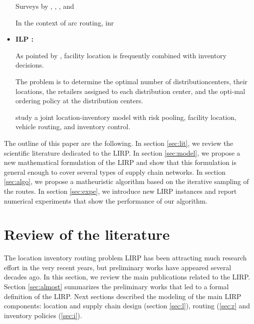 \documentclass[a4paper,10pt]{article}
\begin{document}
\begin{linenumbers}
\begin{itemize}
		
	
	\cite{Laporte1987} 
	
	Surveys by \cite{MinJS98}, \cite{NagySahli07}, \cite{ProdhonPrins2014}, \cite{DrexlSchneider2015} and \cite{Schneider2017} 
	
	
	
In the context of arc routing, 	\cite{Riquelme2016} inr

	
	
	\item \textbf{ILP : }
	
	As pointed by \cite{Melo2009}, facility location is frequently combined with inventory decisions. 

 The problem is to determine the optimal number of distributioncenters,  their locations,  the retailers assigned to each distribution center,  and the opti-mal ordering policy at the distribution centers. 
	
	
	
	\cite{DasCShen02} study a joint location-inventory model with risk pooling, facility location, vehicle routing, and inventory control.
\cite{kaviani_location-inventory_2009} 

	\cite{farahani_location-inventory_2015}
	
	
		
\end{itemize}


The outline of this paper are the following. 
In section \ref{sec:lit}, we review the scientific literature dedicated to the LIRP. 
In section \ref{sec:model}, we propose a new mathematical formulation of the LIRP and show that this formulation is general enough to 
cover several types of supply chain networks. 
In section \ref{sec:algo}, we propose a matheuristic algorithm based on the iterative sampling of the routes. 
In section \ref{sec:expe}, we introduce new LIRP instances and report numerical experiments that show the performance of our algorithm.


\section{Review of the literature} \label{sec-lit}

The location inventory routing problem LIRP has been attracting much research effort in the very recent years, but preliminary works have appeared several decades ago.  
In this section, we review the main publications related to the LIRP.
Section \ref{sec:almost} summarizes the preliminary works that led to a formal definition of the LIRP. 
Next sections described the modeling of the main LIRP components: location and supply chain design (section \ref{sec:l}), 
routing (\ref{sec:r} and inventory policies (\ref{sec:i}). 


\end{linenumbers}
\end{document}
